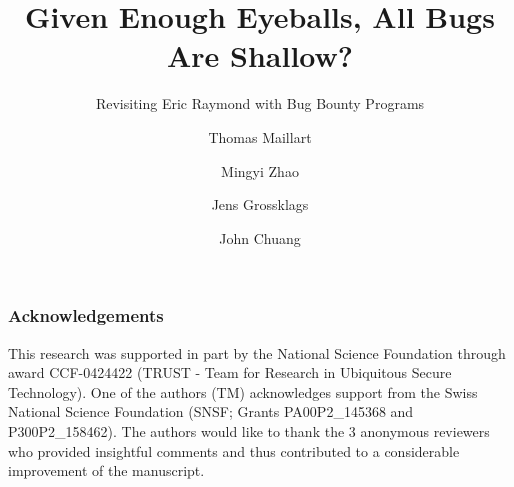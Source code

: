 \documentclass{llncs}
\begin{document}
\title{\large Given Enough Eyeballs, All Bugs Are Shallow?}
\subtitle{\normalsize Revisiting Eric Raymond with Bug Bounty Programs} 




\author{Thomas Maillart \and  Mingyi Zhao \and  Jens Grossklags  \and John Chuang }


\maketitle
\begin{abstract}


\end{abstract}








\subsubsection*{Acknowledgements}
This research was supported in part by the National Science Foundation through award CCF-0424422 (TRUST - Team for Research in Ubiquitous Secure Technology). One of the authors (TM) acknowledges support from the Swiss National Science Foundation (SNSF; Grants PA00P2\_145368  and P300P2\_158462). The authors would like to thank the 3 anonymous reviewers who provided insightful comments and thus contributed to a considerable improvement of the manuscript.





\clearpage

\end{document}
